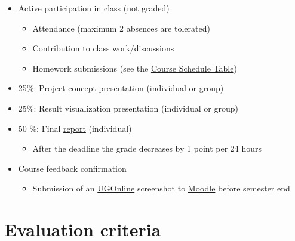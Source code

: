 \documentclass[
  letterpaper,
]{report}
\providecommand{\tightlist}{%
  \setlength{\itemsep}{0pt}\setlength{\parskip}{0pt}}\usepackage{longtable,booktabs,array}
\begin{document}

\begin{itemize}
\item
  Active participation in class (not graded)

  \begin{itemize}
  \item
    Attendance (maximum 2 absences are tolerated)
  \item
    Contribution to class work/discussions
  \item
    Homework submissions (see the \hyperref[tbl-schedule]{Course
    Schedule Table})
  \end{itemize}
\item
  25\%: Project concept presentation (individual or group)
\item
  25\%: Result visualization presentation (individual or group)
\item
  50 \%: Final \hyperref[chap-report]{report} (individual)

  \begin{itemize}
  \tightlist
  \item
    After the deadline the grade decreases by 1 point per 24 hours
  \end{itemize}
\item
  Course feedback confirmation

  \begin{itemize}
  \tightlist
  \item
    Submission of an \href{https://online.uni-graz.at}{UGOnline}
    screenshot to \href{https://moodle.uni-graz.at}{Moodle} before
    semester end
  \end{itemize}
\end{itemize}

\section*{Evaluation criteria}\label{sec-presentation-evaluation}

\end{document}
